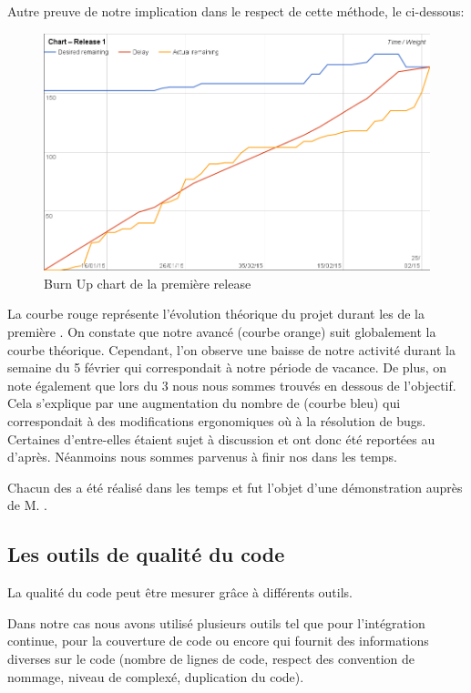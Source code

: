 Autre preuve de notre implication dans le respect de cette méthode, le \BurnUp{} ci-dessous: 
\begin{figure}[H]
	\centering
	\includegraphics[width=14cm]{screens/release1-chart.png}
	\caption{Burn Up chart de la première release}
	\label{fig:burnupchart-release1}
\end{figure}
La courbe rouge représente l'évolution théorique du projet durant les \Sprints{} de la première \Release. On constate que notre avancé (courbe orange)  suit globalement la courbe théorique. Cependant, l'on observe une baisse de notre activité durant la semaine du 5 février qui correspondait à notre période de vacance. De plus, on note également que lors du \Sprint{} 3 nous nous sommes trouvés en dessous de l'objectif. Cela s'explique par une augmentation du nombre de \Stories{} (courbe bleu) qui correspondait à des modifications ergonomiques où à la résolution de bugs. Certaines d'entre-elles étaient sujet à discussion et ont donc été reportées au \Sprint{} d'après. Néanmoins nous sommes parvenus à finir nos \Sprints{} dans les temps. 

Chacun des \Sprints{} a été réalisé dans les temps et fut l'objet d'une démonstration auprès de M. . 

\subsection{Les outils de qualité du code}
La qualité du code peut être mesurer grâce à différents outils. 

Dans notre cas nous avons utilisé plusieurs outils tel que \Travis{} pour l'intégration continue, \Coveralls{} pour la couverture de code ou encore \SonarQube{} qui fournit des informations diverses sur le code (nombre de lignes de code, respect des convention de nommage, niveau de complexé, duplication du code). 


